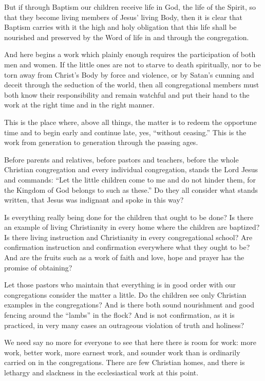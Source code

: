But if through Baptism our children receive life in God, the life of the Spirit, so that they become living members of Jesus’ living Body, then it is clear that Baptism carries with it the high and holy obligation that this life shall be nourished and preserved by the Word of life in and through the congregation.

And here begins a work which plainly enough requires the participation of both men and women. If the little ones are not to starve to death spiritually, nor to be torn away from Christ’s Body by force and violence, or by Satan’s cunning and deceit through the seduction of the world, then all congregational members must both know their responsibility and remain watchful and put their hand to the work at the right time and in the right manner.

This is the place where, above all things, the matter is to redeem the opportune time and to begin early and continue late, yes, “without ceasing.” This is the work from generation to generation through the passing ages.

Before parents and relatives, before pastors and teachers, before the whole Christian congregation and every individual congregation, stands the Lord Jesus and commands: “Let the little children come to me and do not hinder them, for the Kingdom of God belongs to such as these.” Do they all consider what stands written, that Jesus was indignant and spoke in this way?

Is everything really being done for the children that ought to be done? Is there an example of living Christianity in every home where the children are baptized? Is there living instruction and Christianity in every congregational school? Are confirmation instruction and confirmation everywhere what they ought to be? And are the fruits such as a work of faith and love, hope and prayer has the promise of obtaining?

Let those pastors who maintain that everything is in good order with our congregations consider the matter a little. Do the children see only Christian examples in the congregations? And is there both sound nourishment and good fencing around the “lambs” in the flock? And is not confirmation, as it is practiced, in very many cases an outrageous violation of truth and holiness?

We need say no more for everyone to see that here there is room for work: more work, better work, more earnest work, and sounder work than is ordinarily carried on in the congregations. There are few Christian homes, and there is lethargy and slackness in the ecclesiastical work at this point.

